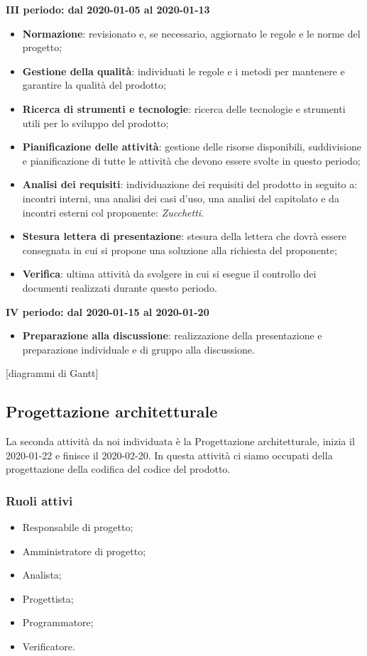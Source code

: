 \textbf{III periodo: dal 2020-01-05 al 2020-01-13}
\begin{itemize}
	\item \textbf{Normazione}: revisionato e, se necessario, aggiornato le regole e le norme del progetto;
	\item \textbf{Gestione della qualità}: individuati le regole e i metodi per mantenere e garantire la qualità del prodotto;
	\item \textbf{Ricerca di strumenti e tecnologie}: ricerca delle tecnologie e strumenti utili per lo sviluppo del prodotto;
	\item \textbf{Pianificazione delle attività}: gestione delle risorse disponibili, suddivisione e pianificazione di tutte le attività che devono essere svolte in questo periodo;
	\item \textbf{Analisi dei requisiti}: individuazione dei requisiti del prodotto in seguito a: incontri interni, una analisi dei casi d'uso, una analisi del capitolato e da incontri esterni col proponente: \textit{Zucchetti}.
	\item \textbf{Stesura lettera di presentazione}: stesura della lettera che dovrà essere consegnata in cui si propone una soluzione alla richiesta del proponente;
	\item \textbf{Verifica}: ultima attività da svolgere in cui si esegue il controllo dei documenti realizzati durante questo periodo.
\end{itemize}

\textbf{IV periodo: dal 2020-01-15 al 2020-01-20}
\begin{itemize}
	\item \textbf{Preparazione alla discussione}: realizzazione della presentazione e preparazione individuale e di gruppo alla discussione.
\end{itemize}

[diagrammi di Gantt]

\subsection{Progettazione architetturale}
La seconda attività da noi individuata è la Progettazione architetturale, inizia il 2020-01-22 e finisce il 2020-02-20. In questa attività ci siamo occupati della progettazione della codifica del codice del prodotto.

\subsubsection{Ruoli attivi}
\begin{itemize}
	\item Responsabile di progetto;
	\item Amministratore di progetto;
	\item Analista;
	\item Progettista;
	\item Programmatore;
	\item Verificatore.
\end{itemize}

